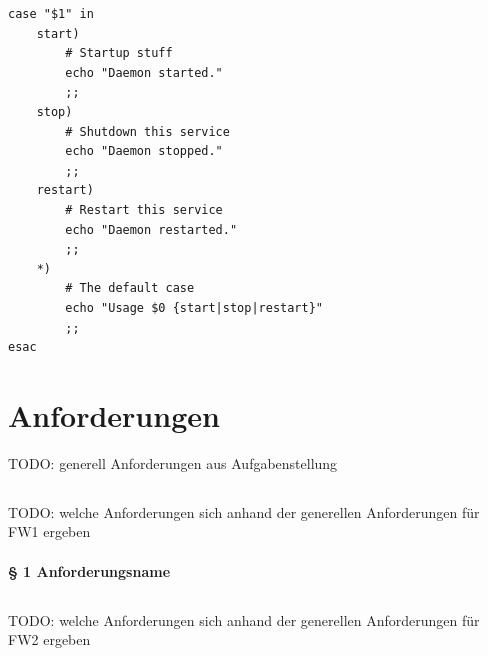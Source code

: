 \begin{lstlisting}[label=lst:lsb-script,caption={Init Script LSB: Eigentliches Skript.}]
case "$1" in
    start)
        # Startup stuff
        echo "Daemon started."
        ;;
    stop)
        # Shutdown this service
        echo "Daemon stopped."
        ;;
    restart)
        # Restart this service
        echo "Daemon restarted."
        ;;
    *)
        # The default case
        echo "Usage $0 {start|stop|restart}"
        ;;
esac
\end{lstlisting}


\section{Anforderungen}

TODO: generell Anforderungen aus Aufgabenstellung

\subsection{\fwa}

TODO: welche Anforderungen sich anhand der generellen Anforderungen für FW1 ergeben

\paragraph{§ 1 Anforderungsname}

\subsection{\fwb}

TODO: welche Anforderungen sich anhand der generellen Anforderungen für FW2 ergeben

